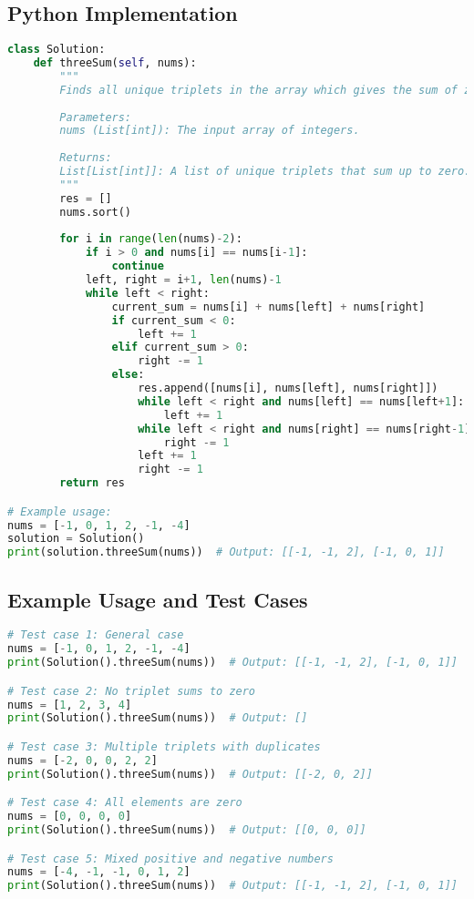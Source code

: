 \subsection*{Python Implementation}
\begin{fullwidth}
\begin{lstlisting}[language=Python]
class Solution:
    def threeSum(self, nums):
        """
        Finds all unique triplets in the array which gives the sum of zero.
        
        Parameters:
        nums (List[int]): The input array of integers.
        
        Returns:
        List[List[int]]: A list of unique triplets that sum up to zero.
        """
        res = []
        nums.sort()
        
        for i in range(len(nums)-2):
            if i > 0 and nums[i] == nums[i-1]:
                continue
            left, right = i+1, len(nums)-1
            while left < right:
                current_sum = nums[i] + nums[left] + nums[right]
                if current_sum < 0:
                    left += 1
                elif current_sum > 0:
                    right -= 1
                else:
                    res.append([nums[i], nums[left], nums[right]])
                    while left < right and nums[left] == nums[left+1]:
                        left += 1
                    while left < right and nums[right] == nums[right-1]:
                        right -= 1
                    left += 1
                    right -= 1
        return res

# Example usage:
nums = [-1, 0, 1, 2, -1, -4]
solution = Solution()
print(solution.threeSum(nums))  # Output: [[-1, -1, 2], [-1, 0, 1]]
\end{lstlisting}
\end{fullwidth}

\subsection*{Example Usage and Test Cases}

\begin{lstlisting}[language=Python]
# Test case 1: General case
nums = [-1, 0, 1, 2, -1, -4]
print(Solution().threeSum(nums))  # Output: [[-1, -1, 2], [-1, 0, 1]]

# Test case 2: No triplet sums to zero
nums = [1, 2, 3, 4]
print(Solution().threeSum(nums))  # Output: []

# Test case 3: Multiple triplets with duplicates
nums = [-2, 0, 0, 2, 2]
print(Solution().threeSum(nums))  # Output: [[-2, 0, 2]]

# Test case 4: All elements are zero
nums = [0, 0, 0, 0]
print(Solution().threeSum(nums))  # Output: [[0, 0, 0]]

# Test case 5: Mixed positive and negative numbers
nums = [-4, -1, -1, 0, 1, 2]
print(Solution().threeSum(nums))  # Output: [[-1, -1, 2], [-1, 0, 1]]
\end{lstlisting}

